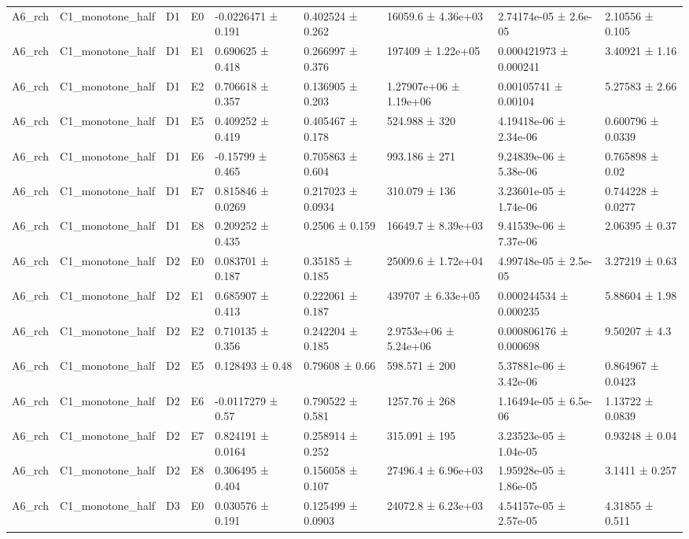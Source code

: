 \begin{table}
\begin{tabular}{lllllllll}
A6\_rch & C1\_monotone\_half & D1 & E0 & -0.0226471 ± 0.191 & 0.402524 ± 0.262 & 16059.6 ± 4.36e+03 & 2.74174e-05 ± 2.6e-05 & 2.10556 ± 0.105 \\
A6\_rch & C1\_monotone\_half & D1 & E1 & 0.690625 ± 0.418 & 0.266997 ± 0.376 & 197409 ± 1.22e+05 & 0.000421973 ± 0.000241 & 3.40921 ± 1.16 \\
A6\_rch & C1\_monotone\_half & D1 & E2 & 0.706618 ± 0.357 & 0.136905 ± 0.203 & 1.27907e+06 ± 1.19e+06 & 0.00105741 ± 0.00104 & 5.27583 ± 2.66 \\
A6\_rch & C1\_monotone\_half & D1 & E5 & 0.409252 ± 0.419 & 0.405467 ± 0.178 & 524.988 ± 320 & 4.19418e-06 ± 2.34e-06 & 0.600796 ± 0.0339 \\
A6\_rch & C1\_monotone\_half & D1 & E6 & -0.15799 ± 0.465 & 0.705863 ± 0.604 & 993.186 ± 271 & 9.24839e-06 ± 5.38e-06 & 0.765898 ± 0.02 \\
A6\_rch & C1\_monotone\_half & D1 & E7 & 0.815846 ± 0.0269 & 0.217023 ± 0.0934 & 310.079 ± 136 & 3.23601e-05 ± 1.74e-06 & 0.744228 ± 0.0277 \\
A6\_rch & C1\_monotone\_half & D1 & E8 & 0.209252 ± 0.435 & 0.2506 ± 0.159 & 16649.7 ± 8.39e+03 & 9.41539e-06 ± 7.37e-06 & 2.06395 ± 0.37 \\
A6\_rch & C1\_monotone\_half & D2 & E0 & 0.083701 ± 0.187 & 0.35185 ± 0.185 & 25009.6 ± 1.72e+04 & 4.99748e-05 ± 2.5e-05 & 3.27219 ± 0.63 \\
A6\_rch & C1\_monotone\_half & D2 & E1 & 0.685907 ± 0.413 & 0.222061 ± 0.187 & 439707 ± 6.33e+05 & 0.000244534 ± 0.000235 & 5.88604 ± 1.98 \\
A6\_rch & C1\_monotone\_half & D2 & E2 & 0.710135 ± 0.356 & 0.242204 ± 0.185 & 2.9753e+06 ± 5.24e+06 & 0.000806176 ± 0.000698 & 9.50207 ± 4.3 \\
A6\_rch & C1\_monotone\_half & D2 & E5 & 0.128493 ± 0.48 & 0.79608 ± 0.66 & 598.571 ± 200 & 5.37881e-06 ± 3.42e-06 & 0.864967 ± 0.0423 \\
A6\_rch & C1\_monotone\_half & D2 & E6 & -0.0117279 ± 0.57 & 0.790522 ± 0.581 & 1257.76 ± 268 & 1.16494e-05 ± 6.5e-06 & 1.13722 ± 0.0839 \\
A6\_rch & C1\_monotone\_half & D2 & E7 & 0.824191 ± 0.0164 & 0.258914 ± 0.252 & 315.091 ± 195 & 3.23523e-05 ± 1.04e-05 & 0.93248 ± 0.04 \\
A6\_rch & C1\_monotone\_half & D2 & E8 & 0.306495 ± 0.404 & 0.156058 ± 0.107 & 27496.4 ± 6.96e+03 & 1.95928e-05 ± 1.86e-05 & 3.1411 ± 0.257 \\
A6\_rch & C1\_monotone\_half & D3 & E0 & 0.030576 ± 0.191 & 0.125499 ± 0.0903 & 24072.8 ± 6.23e+03 & 4.54157e-05 ± 2.57e-05 & 4.31855 ± 0.511 \\

\end{tabular}
\end{table}
